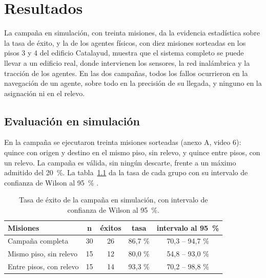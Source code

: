 \chapter{Resultados}
\label{cap:resultados}

La campaña en simulación, con treinta misiones, da la evidencia estadística sobre la tasa de éxito, y la de los agentes físicos, con diez misiones sorteadas en los pisos 3 y 4 del edificio Catalayud, muestra que el sistema completo se puede llevar a un edificio real, donde intervienen los sensores, la red inalámbrica y la tracción de los agentes. En las dos campañas, todos los fallos ocurrieron en la navegación de un agente, sobre todo en la precisión de su llegada, y ninguno en la asignación ni en el relevo.

\section{Evaluación en simulación}
\label{sec:res-sim}

En la campaña se ejecutaron treinta misiones sorteadas (anexo A, video 6): quince con origen y destino en el mismo piso, sin relevo, y quince entre pisos, con un relevo. La campaña es válida, sin ningún descarte, frente a un máximo admitido del 20~\%. La tabla~\ref{tab:exito} da la tasa de cada grupo con su intervalo de confianza de Wilson al 95~\% \autocite{wilson1927probable}.

\begin{table}[H]
  \centering
  \caption{Tasa de éxito de la campaña en simulación, con intervalo de confianza
    de Wilson al 95~\%.}
  \label{tab:exito}
  \begin{tabular}{@{}lcccc@{}}
    \toprule
    \textbf{Misiones} & \textbf{n} & \textbf{éxitos} & \textbf{tasa} & \textbf{intervalo al 95~\%} \\ \midrule
    Campaña completa & 30 & 26 & 86,7 \% & 70,3 -- 94,7 \% \\
    Mismo piso, sin relevo & 15 & 12 & 80,0 \% & 54,8 -- 93,0 \% \\
    Entre pisos, con relevo & 15 & 14 & 93,3 \% & 70,2 -- 98,8 \% \\ \bottomrule
  \end{tabular}
\end{table}

